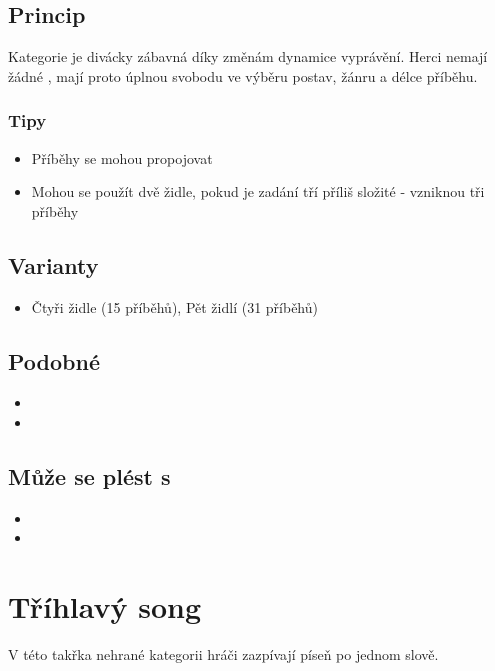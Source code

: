 \subsection{Princip}  
Kategorie je divácky zábavná díky změnám dynamice vyprávění. Herci nemají žádné , mají proto úplnou svobodu ve výběru postav, žánru a délce příběhu. 
 
\subsubsection{Tipy}  
\begin{itemize}
\item  Příběhy se mohou propojovat
\item  Mohou se použít dvě židle, pokud je zadání tří příliš složité - vzniknou tři příběhy
\end{itemize}
 
\subsection{Varianty} \begin{itemize}
\item  Čtyři židle (15 příběhů), Pět židlí (31 příběhů)
\end{itemize}
 
\subsection{Podobné}  
\begin{itemize}
\item  {}
\item  {}
\end{itemize}
 
\subsection{ Může se plést s } \begin{itemize}
\item  {}
\item  {}
\end{itemize}
 
 
 
 
 
 
 
\needspace{5cm} \section{Tříhlavý song} \label{tříhlavý song}  
V této takřka nehrané kategorii hráči zazpívají píseň po jednom slově. 
